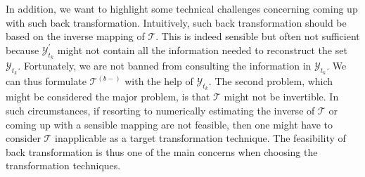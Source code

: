 In addition, we want to highlight some technical challenges concerning coming up with such back transformation. Intuitively, such back transformation should be based on the inverse mapping of $\mathcal{T}$. This is indeed sensible but often not sufficient because $\mathcal{Y}^{'}_{t_k}$ might not contain all the information needed to reconstruct the set $\mathcal{Y}_{t_k}$. Fortunately, we are not banned from consulting the information in $\mathcal{Y}_{t_k}$. We can thus formulate $\mathcal{T}^{(b-)}$ with the help of $\mathcal{Y}_{t_k}$. The second problem, which might be considered the major problem, is that $\mathcal{T}$ might not be invertible. In such circumstances, if resorting to numerically estimating the inverse of $\mathcal{T}$ or coming up with a sensible mapping are not feasible, then one might have to consider $\mathcal{T}$ inapplicable as a target transformation technique. The feasibility of back transformation is thus one of the main concerns when choosing the transformation techniques.

